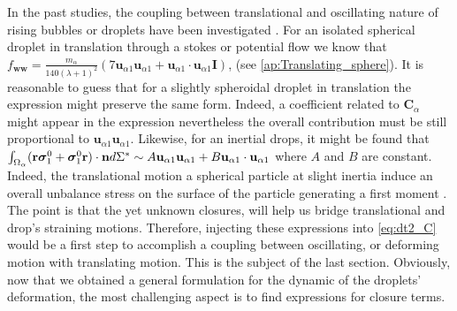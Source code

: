In the past studies, the coupling between translational and oscillating nature of rising bubbles or droplets have been investigated \citet{lalanne2013effect}. 
For an isolated spherical droplet in translation through a stokes or potential flow we know that $
    f_\textbf{ww}
    = \frac{m_\alpha}{140 (\lambda +1)^2}
    (7 \textbf{u}_{\alpha 1} \textbf{u}_{\alpha 1} + \textbf{u}_{\alpha 1}\cdot \textbf{u}_{\alpha 1}\textbf{I})$, 
(see \ref{ap:Translating_sphere}). 
It is reasonable to guess that for a slightly spheroidal droplet in translation the expression might preserve the same form. 
Indeed, a coefficient related to $\textbf{C}_\alpha$ might appear in the expression nevertheless the overall contribution must be still proportional to $\textbf{u}_{\alpha 1} \textbf{u}_{\alpha 1}$. 
Likewise, for an inertial drops, it might be found that 
$\int_{\Omega_\alpha} (\textbf{r}\bm\sigma_1^0+ \bm\sigma_1^0\textbf{r})\cdot \textbf{n} d\Sigma^* \sim A \textbf{u}_{\alpha 1} \textbf{u}_{\alpha 1} + B \textbf{u}_{\alpha 1} \cdot \textbf{u}_{\alpha 1}$ where $A$ and $B$ are constant. 
Indeed, the translational motion a spherical particle at slight inertia induce an overall unbalance stress on the surface of the particle generating a first moment \citet{taylor1964deformation}. 
The point is that the yet unknown closures, will help us bridge translational and drop's straining motions. 
Therefore, injecting these expressions into \ref{eq:dt2_C} would be a first step to accomplish a coupling between oscillating, or deforming motion with translating motion.
This is the subject of the last section. 
Obviously, now that we obtained a general formulation for the dynamic of the droplets' deformation, the most challenging aspect is to find expressions for closure terms. 



